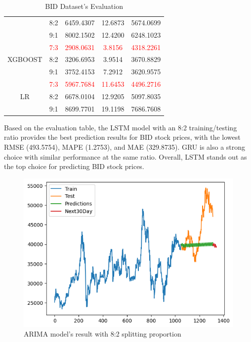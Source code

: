 \documentclass{ieeeojies}
\begin{document}
\begin{table}[H]
\begin{tabular}{|c|c|c|c|c|}
         & 8:2 & 6459.4307 & 12.6873 & 5674.0699 \\ 
         & 9:1 & 8002.1502 & 12.4200 & 6248.1023 \\
         \hline
         \multirow{3}{*}{XGBOOST} 
         & \textcolor{red}{7:3}  & \textcolor{red}{2908.0631} & \textcolor{red}{3.8156} & \textcolor{red}{4318.2261} \\ 
         & 8:2 & 3206.6953 & 3.9514 & 3670.8829 \\ 
         & 9:1 & 3752.4153 & 7.2912 & 3620.9575 \\
         \hline
         \multirow{3}{*}{LR} 
         & \textcolor{red}{7:3} & \textcolor{red}{5967.7684} & \textcolor{red}{11.6453} & \textcolor{red}{4496.2716} \\
         & 8:2 & 6678.0104 & 12.9205 & 5097.8035 \\ 
         & 9:1 & 8699.7701 & 19.1198 & 7686.7608 \\
         \hline
    \end{tabular}
    \caption{BID Dataset's Evaluation}
    \label{vcbdataset}
\end{table}

Based on the evaluation table, the LSTM model with an 8:2 training/testing ratio provides the best prediction results for BID stock prices, with the lowest RMSE (493.5754), MAPE (1.2753), and MAE (329.8735). GRU is also a strong choice with similar performance at the same ratio. Overall, LSTM stands out as the top choice for predicting BID stock prices.

\begin{figure}[H]
  \centering
  \begin{minipage}{0.6\linewidth}
    \centering
    \includegraphics[width=\linewidth]{bibliography/diagram/ARIMA-BID.png}
    \caption{ARIMA model’s result with 8:2 splitting proportion}
    \label{fig8}
  \end{minipage}
\end{figure}
\end{document}
